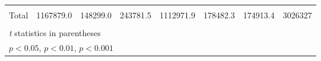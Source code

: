 {\begin{tabular}{l*{7}{c}}
                    &                     &                     &                     &                     &                     &                     &                     \\
[1em]
Total               &   1167879.0         &    148299.0         &    243781.5         &   1112971.9         &    178482.3         &    174913.4         &     3026327         \\
                    &                     &                     &                     &                     &                     &                     &                     \\
\hline\hline
\multicolumn{8}{l}{\footnotesize \textit{t} statistics in parentheses}\\
\multicolumn{8}{l}{\footnotesize \sym{*} \(p<0.05\), \sym{**} \(p<0.01\), \sym{***} \(p<0.001\)}\\
\end{tabular}
}
